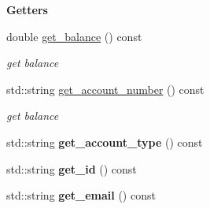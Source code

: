 \begin{Indent}{\bf Getters}\par
\begin{DoxyCompactItemize}
\item 
double \hyperlink{class_cbank__account_a3a04a3ddbbe032c369aa3cf483720f5c}{get\+\_\+balance} () const 
\begin{DoxyCompactList}\small\item\em get balance \end{DoxyCompactList}\item 
std\+::string \hyperlink{class_cbank__account_a666b0e292527ad2886f34a93789ab80d}{get\+\_\+account\+\_\+number} () const 
\begin{DoxyCompactList}\small\item\em get balance \end{DoxyCompactList}\item 
\hypertarget{class_cbank__account_a26714767506b5f22924255892da9ec02}{std\+::string {\bfseries get\+\_\+account\+\_\+type} () const }\label{class_cbank__account_a26714767506b5f22924255892da9ec02}

\item 
\hypertarget{class_cbank__account_af84765f9a447481eb1e7a08978c90328}{std\+::string {\bfseries get\+\_\+id} () const }\label{class_cbank__account_af84765f9a447481eb1e7a08978c90328}

\item 
\hypertarget{class_cbank__account_a66e31c39102d31d3de834b13bf61a245}{std\+::string {\bfseries get\+\_\+email} () const }\label{class_cbank__account_a66e31c39102d31d3de834b13bf61a245}

\end{DoxyCompactItemize}
\end{Indent}
